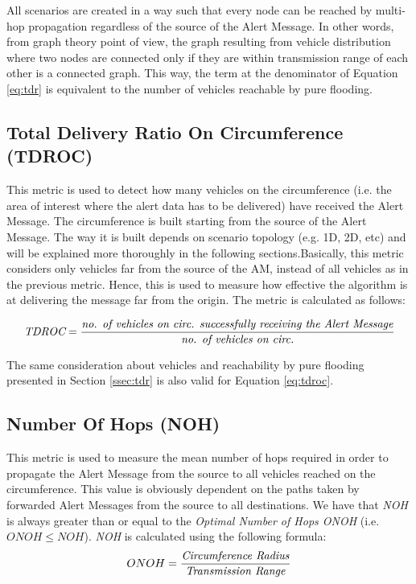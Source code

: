 			All scenarios are created in a way such that every node can be reached by multi-hop propagation regardless of the source of the Alert Message. In other words, from graph theory point of view, the graph resulting from vehicle distribution where two nodes are connected only if they are within transmission range of each other is a connected graph. This way, the term at the denominator of Equation \ref{eq:tdr} is equivalent to the number of vehicles reachable by pure flooding.
			
		\subsection{Total Delivery Ratio On Circumference (TDROC)}
			This metric is used to detect how many vehicles on the circumference (i.e. the area of interest where the alert data has to be delivered) have received the Alert Message. The circumference is built starting from the source of the Alert Message. The way it is built depends on scenario topology (e.g. 1D, 2D, etc) and will be explained more thoroughly in the following sections.Basically, this metric considers only vehicles far from the source of the AM, instead of all vehicles as in the previous metric. Hence, this is used to measure how effective the algorithm is at delivering the message far from the origin. The metric is calculated as follows:
			
			\begin{gather}
			 	\label{eq:tdroc}
			 	\textit{TDROC} = \frac{\textrm{\textit{no. of vehicles on circ. successfully receiving the Alert Message}}}{\textrm{\textit{no. of vehicles on circ.}}}
			\end{gather}
		
			The same consideration about vehicles and reachability by pure flooding presented in Section \ref{ssec:tdr} is also valid for Equation \ref{eq:tdroc}.
			
		\subsection{Number Of Hops (NOH)}
			This metric is used to measure the mean number of hops required in order to propagate the Alert Message from the source to all vehicles reached on the circumference. This value is obviously dependent on the paths taken by forwarded Alert Messages from the source to all destinations. We have that \textit{NOH} is always greater than or equal to the \textit{Optimal Number of Hops ONOH} (i.e. $ONOH \leq NOH$). \textit{NOH} is calculated using the following formula:
			$$ ONOH = \frac{\textrm{\textit{Circumference Radius}}}{\textrm{\textit{Transmission Range}}} $$
			
